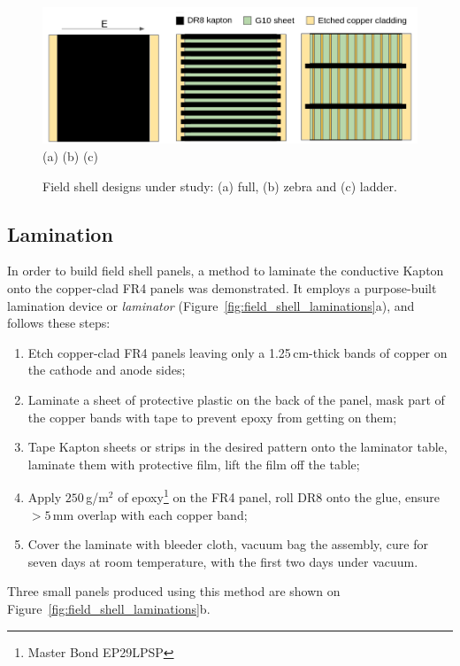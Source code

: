 \documentclass[a4paper,12pt]{article}
\newcommand{\DR}{DR8}
\begin{document}
\begin{figure}[htbp]
\centering

\includegraphics[width=.9\linewidth]{shell_designs_noccc.png} \\
(a) \hspace{0.25\textwidth} (b) \hspace{0.25\textwidth} (c)
\caption{Field shell designs under study: (a) full, (b) zebra and (c) ladder.}
\label{fig:shell_designs}
\end{figure}

\subsection{Lamination}
\label{sec:lamination}
In order to build field shell panels, a method to laminate the conductive Kapton onto the copper-clad FR4 panels was demonstrated. It employs a purpose-built lamination device or \textit{laminator} (Figure~\ref{fig:field_shell_laminations}a), and follows these steps:
\begin{enumerate}
    \item Etch copper-clad FR4 panels leaving only a 1.25\,cm-thick bands of copper on the cathode and anode sides;
    \item Laminate a sheet of protective plastic on the back of the panel, mask part of the copper bands with tape to prevent epoxy from getting on them;
    \item Tape Kapton sheets or strips in the desired pattern onto the laminator table, laminate them with protective film, lift the film off the table;
    \item Apply $250$\,g/m$^2$ of epoxy\footnote{Master Bond EP29LPSP} on the FR4 panel, roll {\DR} onto the glue, ensure $>5\,$mm overlap with each copper band;
    \item Cover the laminate with bleeder cloth, vacuum bag the assembly, cure for seven days at room temperature, with the first two days under vacuum.
\end{enumerate}
Three small panels produced using this method are shown on Figure~\ref{fig:field_shell_laminations}b.
\end{document}

